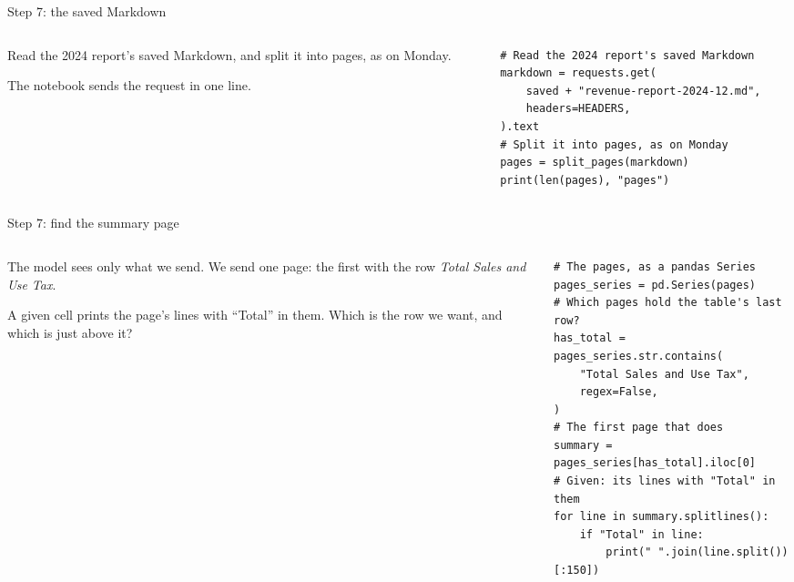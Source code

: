 \documentclass[9pt,aspectratio=169]{beamer}
\begin{document}
\begin{frame}[fragile]{Step 7: the saved Markdown}
    \begin{columns}[T]
        \begin{column}{0.37\textwidth}
            Read the 2024 report's saved Markdown, and split it into pages, as on Monday.

            \medskip
            The notebook sends the request in one line.
        \end{column}
        \begin{column}{0.6\textwidth}
\begin{lstlisting}
# Read the 2024 report's saved Markdown
markdown = requests.get(
    saved + "revenue-report-2024-12.md",
    headers=HEADERS,
).text
# Split it into pages, as on Monday
pages = split_pages(markdown)
print(len(pages), "pages")
\end{lstlisting}
        \end{column}
    \end{columns}
\end{frame}

\begin{frame}[fragile]{Step 7: find the summary page}
    \begin{columns}[T]
        \begin{column}{0.37\textwidth}
            The model sees only what we send. We send one page: the first with the row \textit{Total Sales and Use Tax}.

            \medskip
            A given cell prints the page's lines with ``Total'' in them. Which is the row we want, and which is just above it?
        \end{column}
        \begin{column}{0.6\textwidth}
\begin{lstlisting}
# The pages, as a pandas Series
pages_series = pd.Series(pages)
# Which pages hold the table's last row?
has_total = pages_series.str.contains(
    "Total Sales and Use Tax",
    regex=False,
)
# The first page that does
summary = pages_series[has_total].iloc[0]
# Given: its lines with "Total" in them
for line in summary.splitlines():
    if "Total" in line:
        print(" ".join(line.split())[:150])
\end{lstlisting}
        \end{column}
    \end{columns}
\end{frame}
\end{document}
